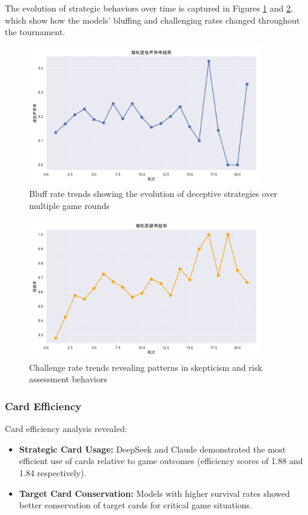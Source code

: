 \documentclass{article}
\begin{document}
The evolution of strategic behaviors over time is captured in Figures \ref{fig:bluff_trend} and \ref{fig:challenge_trend}, which show how the models' bluffing and challenging rates changed throughout the tournament.

\begin{figure}[H]
    \centering
    \includegraphics[width=0.9\textwidth]{figures/bluff_rate_trend.png}
    \caption{Bluff rate trends showing the evolution of deceptive strategies over multiple game rounds}
    \label{fig:bluff_trend}
\end{figure}

\begin{figure}[H]
    \centering
    \includegraphics[width=0.9\textwidth]{figures/challenge_rate_trend.png}
    \caption{Challenge rate trends revealing patterns in skepticism and risk assessment behaviors}
    \label{fig:challenge_trend}
\end{figure}

\subsubsection{Card Efficiency}
Card efficiency analysis revealed:
\begin{itemize}
    \item \textbf{Strategic Card Usage:} DeepSeek and Claude demonstrated the most efficient use of cards relative to game outcomes (efficiency scores of 1.88 and 1.84 respectively).
    \item \textbf{Target Card Conservation:} Models with higher survival rates showed better conservation of target cards for critical game situations.
\end{itemize}
\end{document}
